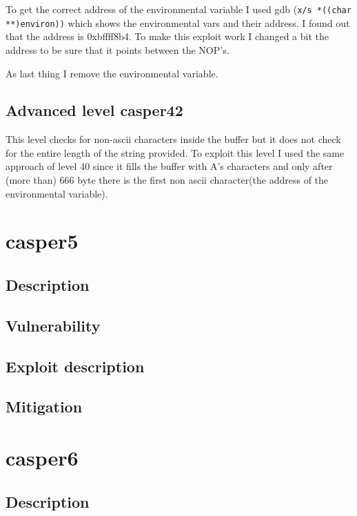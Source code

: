 \documentclass[a4paper,12pt]{article}
\begin{document}
To get the correct address of the environmental variable I used gdb (\texttt{x/s *((char **)environ))} which shows the environmental vars and their address. I found out that the address is 0xbffff8b4. To make this exploit work I changed a bit the address to be sure that it points between the NOP's.

As last thing I remove the environmental variable.

\subsection{Advanced level casper42}

This level checks for non-ascii characters inside the buffer but it does not check for the entire length of the string provided. To exploit this level I used the same approach of level 40 since it fills the buffer with A's characters and only after (more than) 666 byte there is the first non ascii character(the address of the environmental variable).

\section{casper5}

\subsection{Description}

\subsection{Vulnerability}

\subsection{Exploit description}
\subsection{Mitigation}

\section{casper6}


\subsection{Description}
\end{document}
